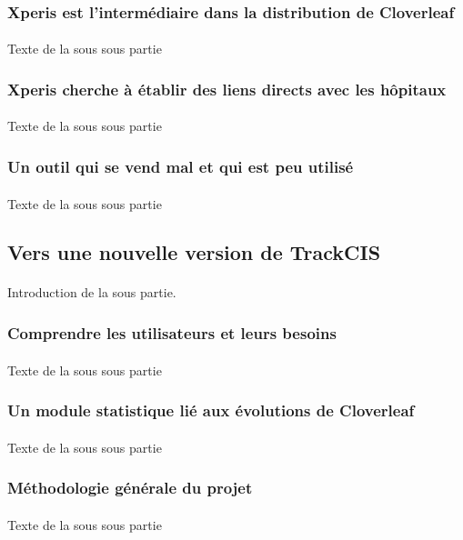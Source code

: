 		\subsubsection{Xperis est l'intermédiaire dans la distribution de Cloverleaf}
			\paragraph{}
			Texte de la sous sous partie
		\subsubsection{Xperis cherche à établir des liens directs avec les hôpitaux}
			\paragraph{}
			Texte de la sous sous partie
		\subsubsection{Un outil qui se vend mal et qui est peu utilisé}
			\paragraph{}
			Texte de la sous sous partie
	
	\subsection{Vers une nouvelle version de TrackCIS}
		\paragraph{}
		Introduction de la sous partie.
		
		\subsubsection{Comprendre les utilisateurs et leurs besoins}
			\paragraph{}
			Texte de la sous sous partie
		\subsubsection{Un module statistique lié aux évolutions de Cloverleaf}
			\paragraph{}
			Texte de la sous sous partie
		\subsubsection{Méthodologie générale du projet}
			\paragraph{}
			Texte de la sous sous partie
			